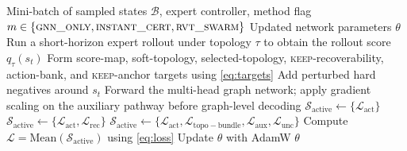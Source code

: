 \documentclass{ieeeaccess}
\newcommand{\cT}{\mathcal{T}}
\begin{document}
\begin{algorithm}[H]
\caption{Counterfactual Rollout Supervision and Multi-Head Training}
\label{alg:training_pipeline}
\begin{algorithmic}[1]
\REQUIRE Mini-batch of sampled states $\mathcal{B}$, expert
controller, method flag
$m \in \{\textsc{gnn\_only}, \textsc{instant\_cert},
\textsc{rvt\_swarm}\}$
\ENSURE Updated network parameters $\theta$
    \FORALL{$\tau \in \cT$}
        \STATE Run a short-horizon expert rollout under topology $\tau$
        to obtain the rollout score $q_\tau(s_t)$
    \ENDFOR
    \STATE Form score-map, soft-topology, selected-topology,
    \textsc{keep}-recoverability, action-bank, and \textsc{keep}-anchor
    targets using \eqref{eq:targets}
        \STATE Add perturbed hard negatives around $s_t$
    \ENDIF
\ENDFOR
\STATE Forward the multi-head graph network; apply gradient scaling on
the auxiliary pathway before graph-level decoding
    \STATE $\mathcal{S}_{\mathrm{active}} \leftarrow
    \{\mathcal{L}_{\mathrm{act}}\}$
    \STATE $\mathcal{S}_{\mathrm{active}} \leftarrow
    \{\mathcal{L}_{\mathrm{act}},\mathcal{L}_{\mathrm{rec}}\}$
\ELSE
    \STATE $\mathcal{S}_{\mathrm{active}} \leftarrow
    \{\mathcal{L}_{\mathrm{act}},\mathcal{L}_{\mathrm{topo-bundle}},
    \mathcal{L}_{\mathrm{aux}},\mathcal{L}_{\mathrm{unc}}\}$
\ENDIF
\STATE Compute $\mathcal{L}=\mathrm{Mean}(\mathcal{S}_{\mathrm{active}})$
using \eqref{eq:loss}
\STATE Update $\theta$ with AdamW
\RETURN $\theta$
\end{algorithmic}
\end{algorithm}
\end{document}
